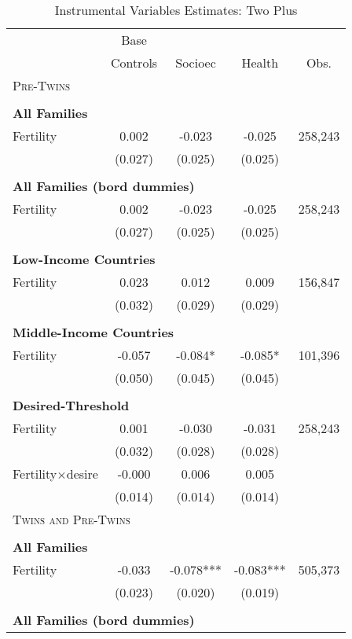 \begin{table}[!htbp] \centering 
\caption{Instrumental Variables Estimates: Two Plus} \vspace{4mm} 
\label{TWINtab:IVTwoplus} 
\begin{tabular}{lcccc} \toprule \toprule 
&Base&&&\\
&Controls&Socioec&Health&Obs.\\\midrule
\multicolumn{5}{l}{\textsc{Pre-Twins}}\\ 
&&&&\\
\multicolumn{5}{l}{\textbf{All Families}}\\ 
Fertility&0.002&-0.023&-0.025&258,243\\
         &(0.027)&(0.025)&(0.025)&\\
&&&&\\
\multicolumn{5}{l}{\textbf{All Families (bord dummies)}}\\ 
Fertility&0.002&-0.023&-0.025&258,243\\
         &(0.027)&(0.025)&(0.025)&\\
&&&&\\
\multicolumn{5}{l}{\textbf{Low-Income Countries}}\\ 
Fertility&0.023&0.012&0.009&156,847\\
         &(0.032)&(0.029)&(0.029)&\\
&&&&\\
\multicolumn{5}{l}{\textbf{Middle-Income Countries}}\\ 
Fertility&-0.057&-0.084*&-0.085*&101,396\\
         &(0.050)&(0.045)&(0.045)&\\
&&&&\\
\multicolumn{5}{l}{\textbf{Desired-Threshold}}\\ 
Fertility&0.001&-0.030&-0.031&258,243\\
         &(0.032)&(0.028)&(0.028)&\\
Fertility$\times$desire&-0.000&0.006&0.005&\\
         &(0.014)&(0.014)&(0.014)&\\
\midrule\multicolumn{5}{l}{\textsc{Twins and Pre-Twins}}\\ 
&&&&\\
\multicolumn{5}{l}{\textbf{All Families}}\\ 
Fertility&-0.033&-0.078***&-0.083***&505,373\\
         &(0.023)&(0.020)&(0.019)&\\
&&&&\\
\multicolumn{5}{l}{\textbf{All Families (bord dummies)}}\\ 

\end{tabular}
\end{table}
